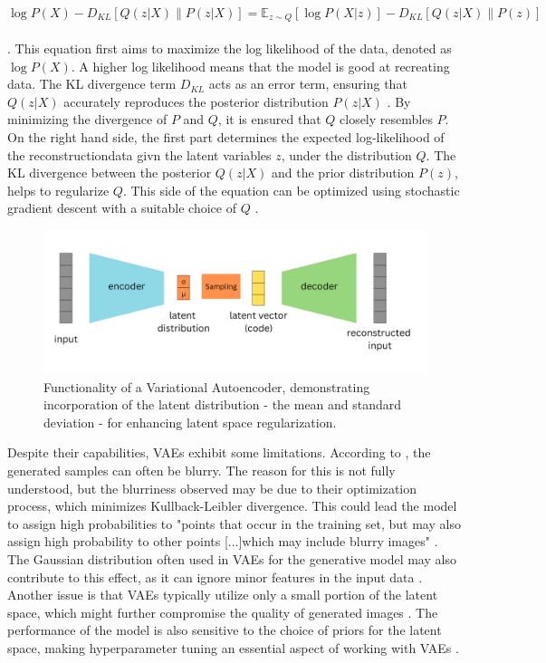 \[
\log P(X) - D_{KL} \left[ Q(z|X) \parallel P(z|X) \right] = \mathbb{E}_{z \sim Q} \left[ \log P(X|z) \right] - D_{KL} \left[ Q(z|X) \parallel P(z) \right]
\]
\\

\citep{doerschVAE}.
This equation first aims to maximize the log likelihood of the data, denoted as \(\log P(X)\). A higher log likelihood means that the model is good at recreating data. The KL divergence term \(D_{KL} \) acts as an error term, ensuring that \(Q(z|X)\) accurately reproduces the posterior distribution \(P(z|X)\) \citep{doerschVAE}. By minimizing the divergence of \(P\) and \(Q\), it is ensured that \(Q\) closely resembles \(P\). On the right hand side, the first part determines the expected log-likelihood of the reconstructiondata givn the latent variables \(z\), under the distribution \(Q\). The KL divergence between the posterior \(Q(z|X)\) and the prior distribution \(P(z)\), helps to regularize \(Q\). This side of the equation can be optimized using stochastic gradient descent with a suitable choice of \(Q\) \citep{doerschVAE}. 

\begin{figure}[ht]
    \centering
      \hspace{.8cm}
      \includegraphics[width=.9\columnwidth]{figures/VAE.png}
      \caption{Functionality of a Variational Autoencoder, demonstrating incorporation of the latent distribution - the mean and standard deviation - for enhancing latent space regularization.}
      \label{fig:figureVAE}
\end{figure}

Despite their capabilities, VAEs exhibit some limitations. According to \citeauthor{GoodfellowDeepLearning}, the generated samples can often be blurry. The reason for this is not fully 
understood, but the blurriness observed may be due to their optimization process, which minimizes Kullback-Leibler divergence. This could lead the model to assign high probabilities to "points that occur in the training set, but may also assign high probability to other points [...]which may include blurry images" \citep{GoodfellowDeepLearning}. The Gaussian distribution often used in VAEs for the generative model may also contribute to this effect, as it can ignore minor features in the input data \citep{GoodfellowDeepLearning}. Another issue is that VAEs typically utilize only a small portion of the latent space, which might further compromise the quality of generated images \citep{GoodfellowDeepLearning}. The performance of the model is also sensitive to the choice of priors for the latent space, making hyperparameter tuning an essential aspect of working with VAEs \citep{kingmaVAE, higginsVAE}. 

